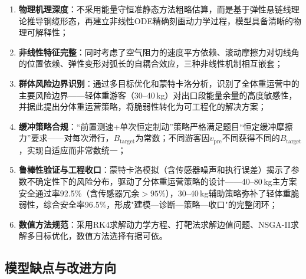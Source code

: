 \documentclass[12pt,a4paper]{ctexart}
\begin{document}
\begin{enumerate}[label=(\arabic*), leftmargin=2em]
  \item \textbf{物理机理深度}：不采用能量守恒准静态方法粗略估算，而是基于弹性悬链线理论推导钢缆形态，再建立非线性ODE精确刻画动力学过程，模型具备清晰的物理可解释性；
  \item \textbf{非线性特征完整}：同时考虑了空气阻力的速度平方依赖、滚动摩擦力对切线角的位置依赖、弹性变形对弧长的自耦合效应，三种非线性机制相互嵌套；
  \item \textbf{群体风险边界识别}：通过多目标优化和蒙特卡洛分析，识别了全体重运营中的主要风险边界——轻体重游客（30--40\,kg）对出口段能量余量的高度敏感性，并据此提出分体重运营策略，将脆弱性转化为可工程化的解决方案；
  \item \textbf{缓冲策略合规}：``前置测速+单次恒定制动''策略严格满足题目``恒定缓冲摩擦力''要求——对每次滑行，$B_{\text{target}}$为常数；不同游客因$v_{\text{pre}}$不同获得不同的$B_{\text{target}}$，实现自适应而非常数统一；
  \item \textbf{鲁棒性验证与工程收口}：蒙特卡洛模拟（含传感器噪声和执行误差）揭示了参数不确定性下的风险分布，驱动了分体重运营策略的设计——40--80\,kg主方案安全通过率92.5\%（含传感器冗余$>95\%$），30--40\,kg辅助策略弥补了轻体重脆弱性，综合安全率96.5\%，形成"建模—诊断—策略—收口"的完整闭环；
  \item \textbf{数值方法规范}：采用RK4求解动力学方程、打靶法求解边值问题、NSGA-II求解多目标优化，数值方法选择有据可依。
\end{enumerate}

\subsection{模型缺点与改进方向}
\end{document}
